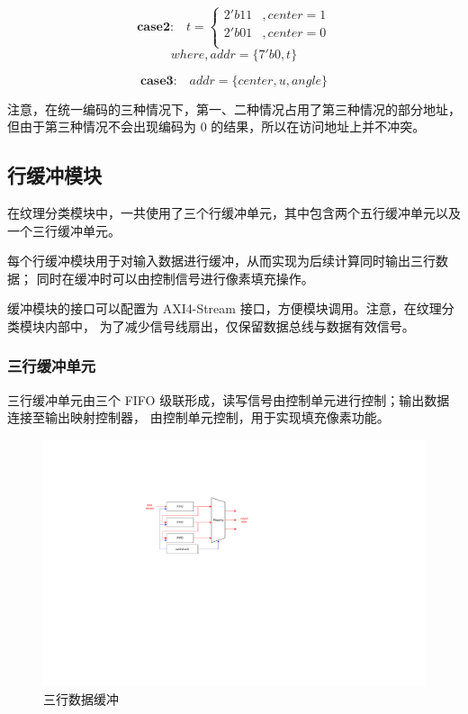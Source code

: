 \documentclass[12pt, a4paper, oneside]{ctexbook}
\begin{document}
	$$
	\textbf{case2:} \quad t=
	\begin{cases}
		2'b11 &,center = 1 \\
		2'b01 &,center = 0 \\
	\end{cases}
	$$
	$$
	where, addr={\{7'b0, t\}}
	$$
	
	
	$$
	\textbf{case3:} \quad addr={\{center, u, angle\}}
	$$
	\par 注意，在统一编码的三种情况下，第一、二种情况占用了第三种情况的部分地址，
	但由于第三种情况不会出现编码为 0 的结果，所以在访问地址上并不冲突。	
	
	\subsection{行缓冲模块}
	在纹理分类模块中，一共使用了三个行缓冲单元，其中包含两个五行缓冲单元以及一个三行缓冲单元。
	\par 每个行缓冲模块用于对输入数据进行缓冲，从而实现为后续计算同时输出三行数据；
	同时在缓冲时可以由控制信号进行像素填充操作。
	\par 	缓冲模块的接口可以配置为 AXI4-Stream 接口，方便模块调用。注意，在纹理分类模块内部中，
	为了减少信号线扇出，仅保留数据总线与数据有效信号。
	\subsubsection{三行缓冲单元}
	三行缓冲单元由三个 FIFO 级联形成，读写信号由控制单元进行控制；输出数据连接至输出映射控制器，
	由控制单元控制，用于实现填充像素功能。
	\begin{figure}[h]	
		\centering
		\includegraphics[scale=1]{pic/fifo_3.pdf}
		\caption{三行数据缓冲}
	\end{figure}	
\end{document}
